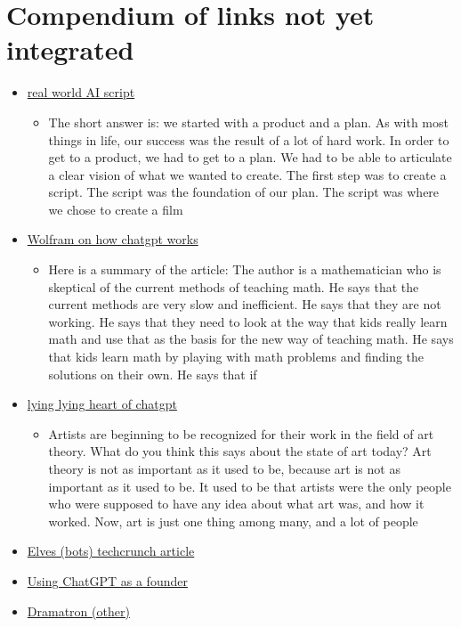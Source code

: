 \section{Compendium of links not yet integrated}
\begin{itemize}
\item
  \href{https://stephenfollows.com/how-we-got-hired-to-create-an-ai-generated-feature-film-screenplay/}{real
  world AI script}

  \begin{itemize}
  \tightlist
  \item
    The short answer is: we started with a product and a plan. As with
    most things in life, our success was the result of a lot of hard
    work. In order to get to a product, we had to get to a plan. We had
    to be able to articulate a clear vision of what we wanted to create.
    The first step was to create a script. The script was the foundation
    of our plan. The script was where we chose to create a film
  \end{itemize}
\item
  \href{https://writings.stephenwolfram.com/2023/02/what-is-chatgpt-doing-and-why-does-it-work/}{Wolfram
  on how chatgpt works}

  \begin{itemize}
  \tightlist
  \item
    Here is a summary of the article: The author is a mathematician who
    is skeptical of the current methods of teaching math. He says that
    the current methods are very slow and inefficient. He says that they
    are not working. He says that they need to look at the way that kids
    really learn math and use that as the basis for the new way of
    teaching math. He says that kids learn math by playing with math
    problems and finding the solutions on their own. He says that if
  \end{itemize}
\item
  \href{https://news.artnet.com/art-world/chatgpt-art-theory-hal-foster-2263711}{lying
  lying heart of chatgpt}

  \begin{itemize}
  \tightlist
  \item
    Artists are beginning to be recognized for their work in the field
    of art theory. What do you think this says about the state of art
    today? Art theory is not as important as it used to be, because art
    is not as important as it used to be. It used to be that artists
    were the only people who were supposed to have any idea about what
    art was, and how it worked. Now, art is just one thing among many,
    and a lot of people
  \end{itemize}
\item
  \href{https://techcrunch.com/2022/01/12/the-metaverse-will-be-filled-with-elves/}{Elves
  (bots) techcrunch article}
\item
  \href{https://www.atomic14.com/2022/12/05/using-chatgpt-as-a-co-founder.html}{Using
  ChatGPT as a founder}
\item
  \href{https://deepmind.github.io/dramatron/}{Dramatron (other)}


\end{itemize}
